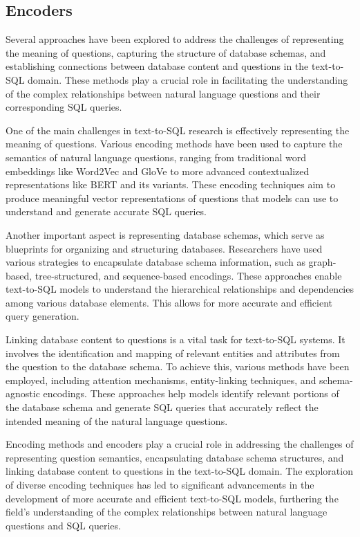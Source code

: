 \subsection{Encoders}
\label{sec:encoders}

Several approaches have been explored to address the challenges of representing the meaning of questions, capturing the structure of database schemas, and establishing connections between database content and questions in the text-to-SQL domain. These methods play a crucial role in facilitating the understanding of the complex relationships between natural language questions and their corresponding SQL queries.

One of the main challenges in text-to-SQL research is effectively representing the meaning of questions. Various encoding methods have been used to capture the semantics of natural language questions, ranging from traditional word embeddings like Word2Vec and GloVe to more advanced contextualized representations like BERT and its variants. These encoding techniques aim to produce meaningful vector representations of questions that models can use to understand and generate accurate SQL queries.

Another important aspect is representing database schemas, which serve as blueprints for organizing and structuring databases. Researchers have used various strategies to encapsulate database schema information, such as graph-based, tree-structured, and sequence-based encodings. These approaches enable text-to-SQL models to understand the hierarchical relationships and dependencies among various database elements. This allows for more accurate and efficient query generation.

Linking database content to questions is a vital task for text-to-SQL systems. It involves the identification and mapping of relevant entities and attributes from the question to the database schema. To achieve this, various methods have been employed, including attention mechanisms, entity-linking techniques, and schema-agnostic encodings. These approaches help models identify relevant portions of the database schema and generate SQL queries that accurately reflect the intended meaning of the natural language questions.

Encoding methods and encoders play a crucial role in addressing the challenges of representing question semantics, encapsulating database schema structures, and linking database content to questions in the text-to-SQL domain. The exploration of diverse encoding techniques has led to significant advancements in the development of more accurate and efficient text-to-SQL models, furthering the field's understanding of the complex relationships between natural language questions and SQL queries.

